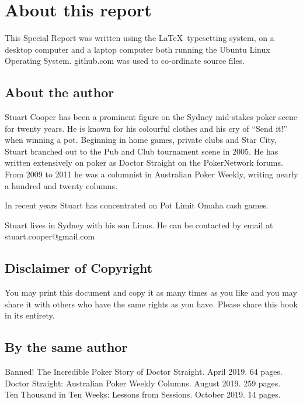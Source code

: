 \chapter*{About this report}


This Special Report was written using the \LaTeX\ typesetting system,
on a desktop computer and a laptop computer both running the Ubuntu
Linux Operating System. github.com was used to co-ordinate source
files.

\section*{About the author}

Stuart Cooper has been a prominent figure on the Sydney mid-stakes poker
scene for twenty years. He is known for his colourful clothes
and his cry of ``Send it!'' when winning a pot.
Beginning in home games, private clubs
and Star City, Stuart branched out to the Pub and Club tournament
scene in 2005. He has written extensively on poker
as Doctor Straight on the PokerNetwork forums. From
2009 to 2011 he was a columnist in Australian Poker Weekly,
writing nearly a hundred and twenty columns.

In recent years Stuart has concentrated on Pot Limit Omaha cash games.

Stuart lives in Sydney with his son Linus. He
can be contacted by email at stuart.cooper@gmail.com

\section*{Disclaimer of Copyright}

You may print this document and copy it as many times as you like and
you may share it with others who have the same rights as you
have. Please share this book in its entirety.

\section*{By the same author}

Banned! The Incredible Poker Story of Doctor Straight. April 2019. 64 pages.\\
Doctor Straight: Australian Poker Weekly Columns. August 2019. 259 pages.\\
Ten Thousand in Ten Weeks: Lessons from Sessions. October 2019. 14 pages.
